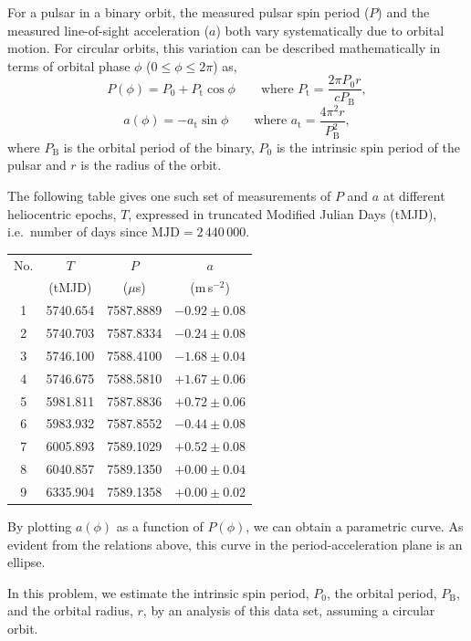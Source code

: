 For a pulsar in a binary orbit, the measured pulsar spin period ($P$) and the
measured line-of-sight acceleration ($a$) both vary systematically due to
orbital motion. For circular orbits, this variation can be described
mathematically in terms of orbital phase $\phi$ ($0 \le \phi \le 2\pi$) as,
\[ P(\phi) = P_0 + P_{\mathrm{t}}\cos\phi \qquad \mbox{where }
   P_{\mathrm{t}} = \frac{2\pi P_0 r}{c P_{\mathrm{B}}}, \]
\[ a(\phi) = -a_{\mathrm{t}}\sin\phi \qquad \mbox{where }
   a_{\mathrm{t}} = \frac{4\pi^2 r}{P_{\mathrm{B}}^2}, \]
where $P_{\mathrm{B}}$ is the orbital period of the binary, $P_0$ is the
intrinsic spin period of the pulsar and $r$ is the radius of the orbit.

The following table gives one such set of measurements of $P$ and $a$ at
different heliocentric epochs, $T$, expressed in truncated Modified Julian
Days (tMJD), i.e.\ number of days since $\mathrm{MJD} = 2\,440\,000$.

\begin{center}
\begin{tabular}{cccc}
No. & $T$ & $P$ & $a$ \\
 & (tMJD) & ($\mu$s) & (m\,s$^{-2}$) \\
1 & 5740.654 & 7587.8889 & $-0.92 \pm 0.08$ \\
2 & 5740.703 & 7587.8334 & $-0.24 \pm 0.08$ \\
3 & 5746.100 & 7588.4100 & $-1.68 \pm 0.04$ \\
4 & 5746.675 & 7588.5810 & $+1.67 \pm 0.06$ \\
5 & 5981.811 & 7587.8836 & $+0.72 \pm 0.06$ \\
6 & 5983.932 & 7587.8552 & $-0.44 \pm 0.08$ \\
7 & 6005.893 & 7589.1029 & $+0.52 \pm 0.08$ \\
8 & 6040.857 & 7589.1350 & $+0.00 \pm 0.04$ \\
9 & 6335.904 & 7589.1358 & $+0.00 \pm 0.02$ \\
\end{tabular}
\end{center}

By plotting $a(\phi)$ as a function of $P(\phi)$, we can obtain a parametric
curve. As evident from the relations above, this curve in the
period-acceleration plane is an ellipse.

In this problem, we estimate the intrinsic spin period, $P_0$, the orbital
period, $P_{\mathrm{B}}$, and the orbital radius, $r$, by an analysis of this
data set, assuming a circular orbit.


